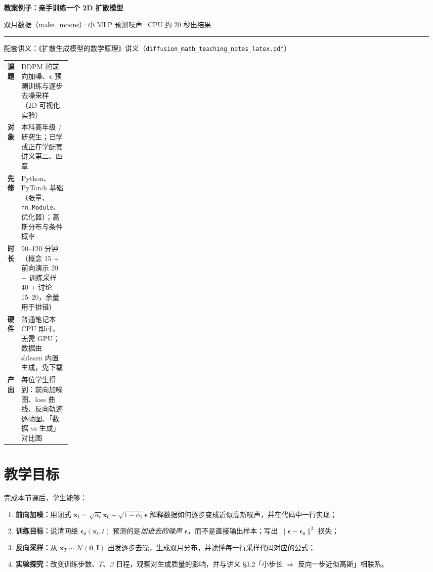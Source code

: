 \documentclass[a4paper,fontset=none,zihao=5]{ctexart}
\newcommand{\x}{\mathbf{x}}
\newcommand{\I}{\mathbf{I}}
\newcommand{\N}{\mathcal{N}}
\newcommand{\abar}{\bar{\alpha}}
\newcommand{\eps}{\boldsymbol{\epsilon}}
\newcommand{\epst}{\boldsymbol{\epsilon}_\theta}
\newcommand{\code}[1]{\texttt{#1}}
\newcommand{\notes}{《扩散生成模型的数学原理》讲义}
\begin{document}
\thispagestyle{plain}
\begin{center}
  \vspace*{0.6cm}
  {\sffamily\bfseries\fontsize{22}{30}\selectfont\color{ctitle} 教案例子：亲手训练一个 2D 扩散模型\par}
  \vspace{0.4em}
  {\large\color{csub} 双月数据（make\_moons）\enspace·\enspace 小 MLP 预测噪声\enspace·\enspace CPU 约 20 秒出结果\par}
  \vspace{0.4em}
  {\color{chead}\rule{0.6\textwidth}{1.5pt}\par}
  \vspace{0.2em}
  {\small\color{cmuted} 配套讲义：\notes（\code{diffusion\_math\_teaching\_notes\_latex.pdf}）\par}
\end{center}

\begin{keybox}
\small
\renewcommand{\arraystretch}{1.25}
\begin{tabularx}{\linewidth}{@{}>{\bfseries}p{0.15\linewidth}X@{}}
课题 & DDPM 的前向加噪、$\eps$ 预测训练与逐步去噪采样（2D 可视化实验） \\
对象 & 本科高年级 / 研究生；已学或正在学配套讲义第二、四章 \\
先修 & Python、PyTorch 基础（张量、\code{nn.Module}、优化器）；高斯分布与条件概率 \\
时长 & 90–120 分钟（概念 15 + 前向演示 20 + 训练采样 40 + 讨论 15–20，余量用于排错） \\
硬件 & 普通笔记本 CPU 即可，无需 GPU；数据由 sklearn 内置生成，免下载 \\
产出 & 每位学生得到：前向加噪图、loss 曲线、反向轨迹逐帧图、「数据 vs 生成」对比图 \\
\end{tabularx}
\end{keybox}

\section{教学目标}
完成本节课后，学生能够：
\begin{enumerate}[leftmargin=2em,itemsep=1pt]
  \item \textbf{前向加噪：}用闭式 $\x_t=\sqrt{\abar_t}\x_0+\sqrt{1-\abar_t}\eps$ 解释数据如何逐步变成近似高斯噪声，并在代码中一行实现；
  \item \textbf{训练目标：}说清网络 $\epst(\x_t,t)$ 预测的是\emph{加进去的噪声} $\eps$，而不是直接输出样本；写出 $\|\eps-\epst\|^2$ 损失；
  \item \textbf{反向采样：}从 $\x_T\sim\N(\mathbf 0,\I)$ 出发逐步去噪，生成双月分布，并读懂每一行采样代码对应的公式；
  \item \textbf{实验探究：}改变训练步数、$T$、$\beta$ 日程，观察对生成质量的影响，并与讲义 §3.2「小步长 $\Rightarrow$ 反向一步近似高斯」相联系。
\end{enumerate}
\end{document}
